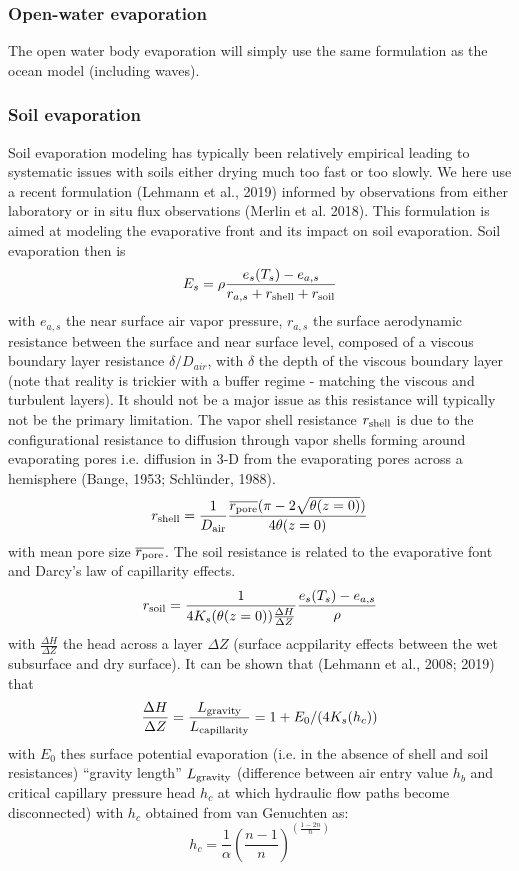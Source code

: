 \documentclass{article}
\begin{document}
\subsubsection{Open-water evaporation}
The open water body evaporation will simply use the same formulation as the ocean model (including waves).
\subsubsection{Soil evaporation}
Soil evaporation modeling has typically been relatively empirical leading to systematic issues with soils either drying much too fast or too slowly. We here use a recent formulation (Lehmann et al., 2019) informed by observations from either laboratory or in situ flux observations (Merlin et al. 2018). This formulation is aimed at modeling the evaporative front and its impact on soil evaporation. 
Soil evaporation then is 
\begin{equation}
    E_s = \rho \frac{e_s(T_s)-e_{a,s}}{r_{a,s}+r_{\rm shell}+r_{\rm soil}}
\end{equation}
with $e_{a,s}$ the near surface air vapor pressure, $r_{a,s}$ the surface aerodynamic resistance between the surface and near surface level, composed of a viscous boundary layer resistance $\delta /D_{air}$, with $\delta$ the depth of the viscous boundary layer (note that reality is trickier with a buffer regime - matching the viscous and turbulent layers). It should not be a major issue as this resistance will typically not be the primary limitation. The vapor shell resistance $r_{\rm shell}$ is due to the configurational resistance to diffusion through vapor shells forming around evaporating pores i.e. diffusion in 3-D from the evaporating pores across a hemisphere (Bange, 1953; Schlünder, 1988).
\begin{equation}
    r_{\rm shell} = \frac{1}{D_{\rm air}}\frac{\overline{r_{\rm pore}}(\pi-2\sqrt{\theta(z=0)})}{4\theta(z=0)}
\end{equation}
with mean pore size $\overline{r_{\rm pore}}$.
The soil resistance is related to the evaporative font and Darcy's law of capillarity effects.
\begin{equation}
    r_{\rm soil} = \frac{1}{4 K_s(\theta(z=0))\frac{\Delta H}{\Delta Z}}\frac{e_s(T_s)-e_{a,s}}{\rho}
\end{equation}
with $\frac{\Delta H}{\Delta Z}$ the head across a layer $\Delta Z$ (surface acppilarity effects between the wet subsurface and dry surface). It can be shown that (Lehmann et al., 2008; 2019) that 
\begin{equation}
   \frac{\Delta H}{\Delta Z} = \frac{L_{\rm gravity}}{L_{\rm capillarity}} = 1+E_0/(4K_s(h_c))
\end{equation}
with $E_0$ thes surface potential evaporation (i.e. in the absence of shell and soil resistances) “gravity length” $L_{\rm gravity}$ (difference between air entry value $h_b$ and critical capillary pressure head $h_c$ at which hydraulic flow paths become disconnected) with $h_c$ obtained from van Genuchten as:
\begin{equation}
   h_c = \frac{1}{\alpha}\left( \frac{n-1}{n} \right)^{\left( \frac{1-2n}{n} \right)}
\end{equation}
\end{document}
